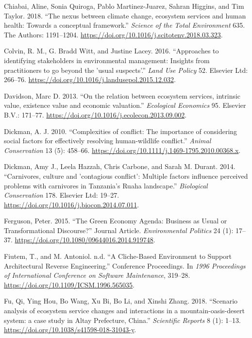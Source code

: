 \documentclass[fleqn,10pt]{wlpeerj} %
\begin{document}
\leavevmode\hypertarget{ref-Chiabai2018}{}%
Chiabai, Aline, Sonia Quiroga, Pablo Martinez-Juarez, Sahran Higgins,
and Tim Taylor. 2018. ``The nexus between climate change, ecosystem
services and human health: Towards a conceptual framework.''
\emph{Science of the Total Environment} 635. The Authors: 1191--1204.
\url{https://doi.org/10.1016/j.scitotenv.2018.03.323}.

\leavevmode\hypertarget{ref-Colvin2016}{}%
Colvin, R. M., G. Bradd Witt, and Justine Lacey. 2016. ``Approaches to
identifying stakeholders in environmental management: Insights from
practitioners to go beyond the 'usual suspects'.'' \emph{Land Use
Policy} 52. Elsevier Ltd: 266--76.
\url{https://doi.org/10.1016/j.landusepol.2015.12.032}.

\leavevmode\hypertarget{ref-Davidson2013}{}%
Davidson, Marc D. 2013. ``On the relation between ecosystem services,
intrinsic value, existence value and economic valuation.''
\emph{Ecological Economics} 95. Elsevier B.V.: 171--77.
\url{https://doi.org/10.1016/j.ecolecon.2013.09.002}.

\leavevmode\hypertarget{ref-Dickman2010}{}%
Dickman, A. J. 2010. ``Complexities of conflict: The importance of
considering social factors for effectively resolving human-wildlife
conflict.'' \emph{Animal Conservation} 13 (5): 458--66.
\url{https://doi.org/10.1111/j.1469-1795.2010.00368.x}.

\leavevmode\hypertarget{ref-Dickman2014}{}%
Dickman, Amy J., Leela Hazzah, Chris Carbone, and Sarah M. Durant. 2014.
``Carnivores, culture and 'contagious conflict': Multiple factors
influence perceived problems with carnivores in Tanzania's Ruaha
landscape.'' \emph{Biological Conservation} 178. Elsevier Ltd: 19--27.
\url{https://doi.org/10.1016/j.biocon.2014.07.011}.

\leavevmode\hypertarget{ref-Ferguson2015}{}%
Ferguson, Peter. 2015. ``The Green Economy Agenda: Business as Usual or
Transformational Discourse?'' Journal Article. \emph{Environmental
Politics} 24 (1): 17--37.
\url{https://doi.org/10.1080/09644016.2014.919748}.

\leavevmode\hypertarget{ref-Fiutem1996}{}%
Fiutem, T., and M. Antoniol. n.d. ``A Cliche-Based Environment to
Support Architectural Reverse Engineering.'' Conference Proceedings. In
\emph{1996 Proceedings of International Conference on Software
Maintenance}, 319--28. \url{https://doi.org/10.1109/ICSM.1996.565035}.

\leavevmode\hypertarget{ref-Fu2018}{}%
Fu, Qi, Ying Hou, Bo Wang, Xu Bi, Bo Li, and Xinshi Zhang. 2018.
``Scenario analysis of ecosystem service changes and interactions in a
mountain-oasis-desert system: a case study in Altay Prefecture, China.''
\emph{Scientific Reports} 8 (1): 1--13.
\url{https://doi.org/10.1038/s41598-018-31043-y}.
\end{document}
